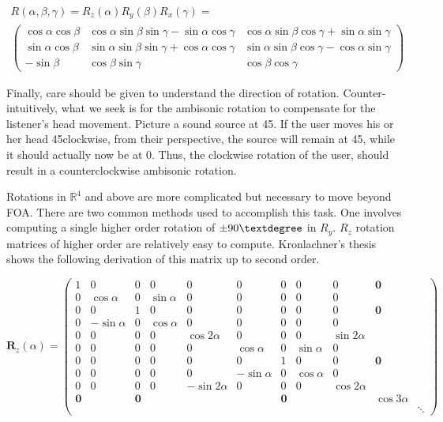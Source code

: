 \begin{equation}
\begin{array}{l}
R(\alpha, \beta, \gamma)=R_{z}(\alpha) R_{y}(\beta) R_{x}(\gamma)= \\
\left(\begin{array}{ccc}
\cos \alpha \cos \beta & \cos \alpha \sin \beta \sin \gamma-\sin \alpha \cos \gamma & \cos \alpha \sin \beta \cos \gamma+\sin \alpha \sin \gamma \\
\sin \alpha \cos \beta & \sin \alpha \sin \beta \sin \gamma+\cos \alpha \cos \gamma & \sin \alpha \sin \beta \cos \gamma-\cos \alpha \sin \gamma \\
-\sin \beta & \cos \beta \sin \gamma & \cos \beta \cos \gamma
\end{array}\right)
\end{array}
\end{equation}

Finally, care should be given to understand the direction of rotation. Counter-intuitively, what we seek is for the ambisonic rotation to compensate for the listener's head movement. Picture a sound source at 45\textdegree. If the user moves his or her head 45\textdegree clockwise, from their perspective, the source will remain at 45\textdegree, while it should actually now be at 0\textdegree. Thus, the clockwise rotation of the user, should result in a counterclockwise ambisonic rotation. 

Rotations in $\mathbb{R}^{4}$ and above are more complicated but necessary to move beyond FOA. There are two common methods used to accomplish this task. One involves computing a single higher order rotation of $\pm90\textdegree$ in $R_{y}$. $R_{z}$ rotation matrices of higher order are relatively easy to compute. Kronlachner's thesis shows the following derivation of this matrix up to second order.

\begin{equation}
\boldsymbol{R}_z(\alpha)=\left(\begin{array}{c|ccc|ccccc|cc}
1 & 0 & 0 & 0 & 0 & 0 & 0 & 0 & 0 & \mathbf{0} & \\
\hline 0 & \cos \alpha & 0 & \sin \alpha & 0 & 0 & 0 & 0 & 0 & \\
0 & 0 & 1 & 0 & 0 & 0 & 0 & 0 & 0 & \mathbf{0} & \\
0 & -\sin \alpha & 0 & \cos \alpha & 0 & 0 & 0 & 0 & 0 & & \\
\hline 0 & 0 & 0 & 0 & \cos 2 \alpha & 0 & 0 & 0 & \sin 2 \alpha & & \\
0 & 0 & 0 & 0 & 0 & \cos \alpha & 0 & \sin \alpha & 0 & \\
0 & 0 & 0 & 0 & 0 & 0 & 1 & 0 & 0 & \mathbf{0} & \\
0 & 0 & 0 & 0 & 0 & -\sin \alpha & 0 & \cos \alpha & 0 & & \\
0 & 0 & 0 & 0 & -\sin 2 \alpha & 0 & 0 & 0 & \cos 2 \alpha & & \\
\hline \mathbf{0} & & \mathbf{0} & & & & \mathbf{0} & & & \cos 3 \alpha & \\
 & & & & & & & & & & \ddots
\end{array}\right)
\end{equation}

